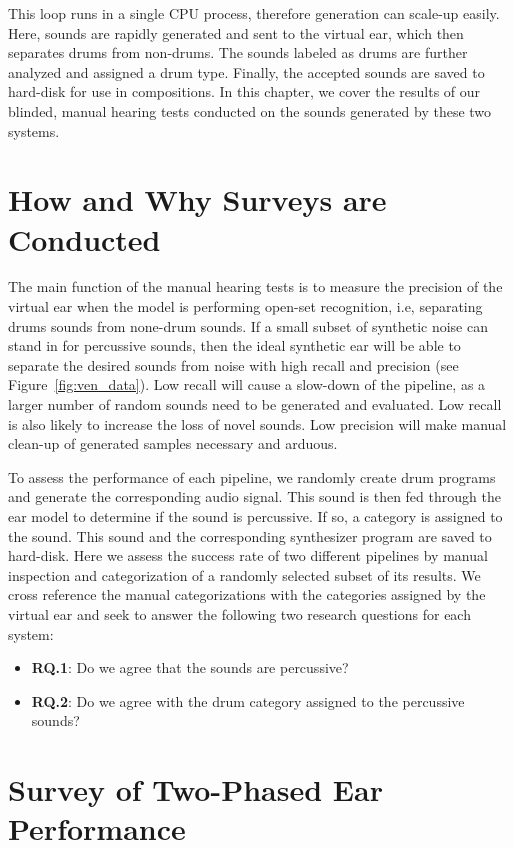 \documentclass[\main/thesis.tex]{subfiles}
\begin{document}
This loop runs in a single CPU process, therefore generation can scale-up easily. Here, sounds are rapidly generated and sent to the virtual ear, which then separates drums from non-drums. The sounds labeled as drums are further analyzed and assigned a drum type. Finally, the accepted sounds are saved to hard-disk for use in compositions. In this chapter, we cover the results of our blinded, manual hearing tests conducted on the sounds generated by these two systems.

\label{gens}
\label{surveys}
\section{How and Why Surveys are Conducted}
 
 The main function of the manual hearing tests is to measure the precision of the virtual ear when the model is performing open-set recognition, i.e, separating drums sounds from none-drum sounds. If a small subset of synthetic noise can stand in for percussive sounds, then the ideal synthetic ear will be able to separate the desired sounds from noise with high recall and precision (see Figure~\ref{fig:ven_data}). Low recall will cause a slow-down of the pipeline, as a larger number of random sounds need to be generated and evaluated. Low recall is also likely to increase the loss of novel sounds. Low precision will make manual clean-up of generated samples necessary and arduous. 

To assess the performance of each pipeline, we randomly create drum programs and generate the corresponding audio signal. This sound is then fed through the ear model to determine if the sound is percussive. If so, a category is assigned to the sound. This sound and the corresponding synthesizer program are saved to hard-disk. Here we assess the success rate of two different pipelines by manual inspection and categorization of a randomly selected subset of its results. We cross reference the manual categorizations with the categories assigned by the virtual ear and seek to answer the following two research questions for each system: 
\begin{itemize}
\item \textbf{RQ.1}: Do we agree that the sounds are percussive? 
\item \textbf{RQ.2}: Do we agree with the drum category assigned to the percussive sounds?
\end{itemize}
 \section{Survey of Two-Phased Ear Performance}
   
\end{document}
